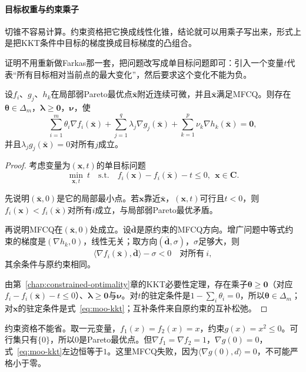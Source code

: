 \paragraph{目标权重与约束乘子}
切锥不容易计算。约束资格把它换成线性化锥，结论就可以用乘子写出来，形式上是把KKT条件中目标的梯度换成目标梯度的凸组合。

证明不用重新做Farkas那一套，把问题改写成单目标问题即可：引入一个变量$t$代表“所有目标相对当前点的最大变化”，然后要求这个变化不能为负。

\begin{theorem}[多目标KKT必要条件]
\label{thm:moo-kkt-necessary}
设$f_i$、$g_j$、$h_k$在局部弱Pareto最优点$\bar{\bm{x}}$附近连续可微，并且$\bar{\bm{x}}$满足MFCQ。则存在$\bm{\theta}\in\Delta_m$，$\bm{\lambda}\geq\bm{0}$，$\bm{\nu}$，使
\begin{equation}
 \sum_{i=1}^m\theta_i\nabla f_i(\bar{\bm{x}})
 +\sum_{j=1}^q\lambda_j\nabla g_j(\bar{\bm{x}})
 +\sum_{k=1}^p\nu_k\nabla h_k(\bar{\bm{x}})=\bm{0},
 \label{eq:moo-kkt}
\end{equation}
并且$\lambda_jg_j(\bar{\bm{x}})=0$对所有$j$成立。
\end{theorem}

\begin{proof}
考虑变量为$(\bm{x},t)$的单目标问题
\[
 \min_{\bm{x},t}\ t\quad\text{s.t.}\quad
 f_i(\bm{x})-f_i(\bar{\bm{x}})-t\leq0,\ \ \bm{x}\in\bm{C}.
\]

先说明$(\bar{\bm{x}},0)$是它的局部最小点。若$\bm{x}$靠近$\bar{\bm{x}}$，$(\bm{x},t)$可行且$t<0$，则$f_i(\bm{x})<f_i(\bar{\bm{x}})$对所有$i$成立，与局部弱Pareto最优矛盾。

再说明MFCQ在$(\bar{\bm{x}},0)$处成立。设$\bar{\bm{d}}$是原约束的MFCQ方向。增广问题中等式约束的梯度是$(\nabla h_k,0)$，线性无关；取方向$(\bar{\bm{d}},\sigma)$，$\sigma$足够大，则
\[
 \langle\nabla f_i(\bar{\bm{x}}),\bar{\bm{d}}\rangle-\sigma<0\quad\text{对所有}\ i,
\]
其余条件与原约束相同。

由第~\ref{chap:constrained-optimality}章的KKT必要性定理，存在乘子$\bm{\theta}\geq\bm{0}$（对应$f_i-f_i(\bar{\bm{x}})-t\leq0$）、$\bm{\lambda}\geq\bm{0}$与$\bm{\nu}$。对$t$的驻定条件是$1-\sum_i\theta_i=0$，所以$\bm{\theta}\in\Delta_m$；对$\bm{x}$的驻定条件是式~\eqref{eq:moo-kkt}；互补条件来自原约束的互补松弛。
\end{proof}

约束资格不能省。取一元变量，$f_1(x)=f_2(x)=x$，约束$g(x)=x^2\leq0$。可行集只有$\{0\}$，所以$0$是Pareto最优点。但$\nabla f_1=\nabla f_2=1$，$\nabla g(0)=0$，式~\eqref{eq:moo-kkt}左边恒等于$1$。这里MFCQ失败，因为$\langle\nabla g(0),d\rangle=0$，不可能严格小于零。

